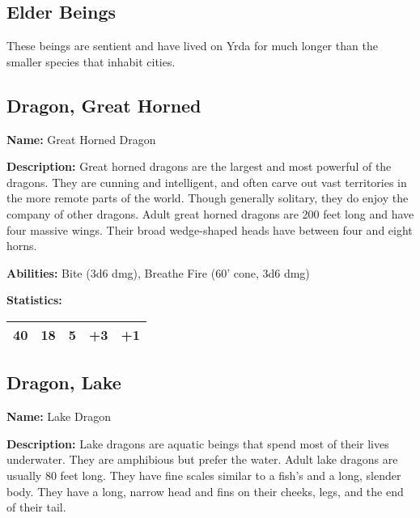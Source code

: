 \begin{multicols}{2}
\section{Elder Beings}

These beings are sentient and have lived on Yrda for much
longer than the smaller species that inhabit cities.

\subsection{Dragon, Great Horned}

\textbf{Name:} Great Horned Dragon

\textbf{Description:} Great horned dragons are the largest and most powerful of the
dragons. They are cunning and intelligent, and often carve out vast territories in the
more remote parts of the world. Though generally solitary, they do enjoy the company of
other dragons. Adult great horned dragons are 200 feet long and have four massive wings.
Their broad wedge-shaped heads have between four and eight horns.

\textbf{Abilities:} Bite (3d6 dmg), Breathe Fire (60' cone, 3d6 dmg)

\textbf{Statistics:}

\begin{center}
{
\begin{xtabular}{|l|l|l|l|l|}
40 & 18 & 5 & +3 & +1 \\
\hline
\end{xtabular}
}
\end{center}

\subsection{Dragon, Lake}

\textbf{Name:} Lake Dragon

\textbf{Description:} Lake dragons are aquatic beings that spend most of their lives underwater.
They are amphibious but prefer the water. Adult lake dragons are usually 80 feet long. They have
fine scales similar to a fish's and a long, slender body. They have a long, narrow head and fins on
their cheeks, legs, and the end of their tail.


\end{multicols}
